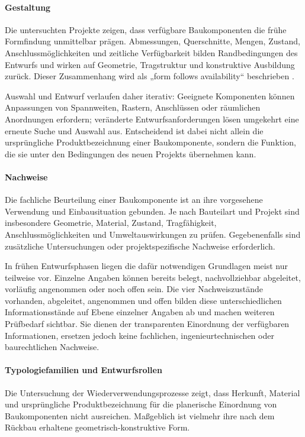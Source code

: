 \documentclass[type=zwischenbericht]{zukunftbau}
\begin{document}
\begin{SemioNest}
\begin{SemioNest}
\paragraph{Gestaltung}
Die untersuchten Projekte zeigen, dass verfügbare Baukomponenten die frühe Formfindung unmittelbar prägen. Abmessungen, Querschnitte, Mengen, Zustand, Anschlussmöglichkeiten und zeitliche Verfügbarkeit bilden Randbedingungen des Entwurfs und wirken auf Geometrie, Tragstruktur und konstruktive Ausbildung zurück. Dieser Zusammenhang wird als „form follows availability“ beschrieben \cite{bruetting-senatore-fivet-form-follows-availability-2019}.

Auswahl und Entwurf verlaufen daher iterativ: Geeignete Komponenten können Anpassungen von Spannweiten, Rastern, Anschlüssen oder räumlichen Anordnungen erfordern; veränderte Entwurfsanforderungen lösen umgekehrt eine erneute Suche und Auswahl aus. Entscheidend ist dabei nicht allein die ursprüngliche Produktbezeichnung einer Baukomponente, sondern die Funktion, die sie unter den Bedingungen des neuen Projekts übernehmen kann.

\paragraph{Nachweise}
Die fachliche Beurteilung einer Baukomponente ist an ihre vorgesehene Verwendung und Einbausituation gebunden. Je nach Bauteilart und Projekt sind insbesondere Geometrie, Material, Zustand, Tragfähigkeit, Anschlussmöglichkeiten und Umweltauswirkungen zu prüfen. Gegebenenfalls sind zusätzliche Untersuchungen oder projektspezifische Nachweise erforderlich.

In frühen Entwurfsphasen liegen die dafür notwendigen Grundlagen meist nur teilweise vor. Einzelne Angaben können bereits belegt, nachvollziehbar abgeleitet, vorläufig angenommen oder noch offen sein. Die vier \Gls{Nachweiszustände} vorhanden, abgeleitet, angenommen und offen bilden diese unterschiedlichen Informationsstände auf Ebene einzelner Angaben ab und machen weiteren Prüfbedarf sichtbar. Sie dienen der transparenten Einordnung der verfügbaren Informationen, ersetzen jedoch keine fachlichen, ingenieurtechnischen oder baurechtlichen Nachweise.
\end{SemioNest}

\paragraph{Typologiefamilien und Entwurfsrollen}
\label{abschnitt:typologiefamilien-und-entwurfsrollen}
Die Untersuchung der Wiederverwendungsprozesse zeigt, dass Herkunft, Material und ursprüngliche Produktbezeichnung für die planerische Einordnung von Baukomponenten nicht ausreichen. Maßgeblich ist vielmehr ihre nach dem Rückbau erhaltene geometrisch-konstruktive Form.


\end{SemioNest}
\end{document}
